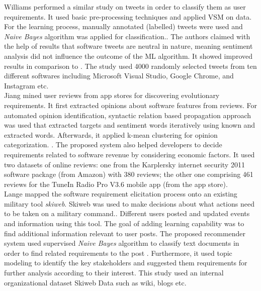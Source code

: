 Williams \etal \cite{Williams:2017} performed a similar study on tweets in order
to classify them as user requirements. It used basic pre-processing techniques and applied VSM on data. For the learning
process, manually annotated (labelled) tweets were used and \emph{Naive Bayes} algorithm was applied for classification.. The authors claimed with the help of results that
software tweets are neutral in nature, meaning sentiment analysis did not
influence the outcome of the ML algorithm. It showed improved results in comparison to \cite{Guzman:2017}.
The study used 4000 randomly selected tweets from ten different
softwares including Microsoft Visual Studio, Google Chrome, and Instagram etc.\\

Jiang \etal \cite{Jiang:2014} mined user reviews from 
app stores for discovering evolutionary requirements. It first extracted opinions about software features from reviews. For automated opinion identification, syntactic
relation based propagation approach was used that extracted targets and sentiment words
iteratively using known and extracted words. Afterwards, it applied k-mean clustering for opinion categorization.
. The proposed system also helped developers to decide requirements related to software revenue by considering economic factors.  It used two datasets of online reviews: one from the
Karplersky internet security 2011 software package (from Amazon) with 380
reviews; the other one comprising 461 reviews for the  TuneIn Radio Pro V3.6
mobile app (from the app store).\\

Lange \etal\cite{Douglas:S2008} mapped the software requirement elicitation
process onto an existing military tool \emph{skiweb}. Skiweb was used to make decisions about what actions need to be taken on a military command.. Different users posted and updated events and information using this tool. The goal of adding learning capability was to find additional information relevant to user posts. The proposed recommender system used supervised
\emph{Naive Bayes} algorithm to classify text documents in order to find related
requirements to the post . Furthermore, it
 used topic modeling to identify the key
stakeholders and suggested them requirements for further analysis according to their interest. This study used an internal organizational
dataset Skiweb Data such as wiki, blogs etc.\\

